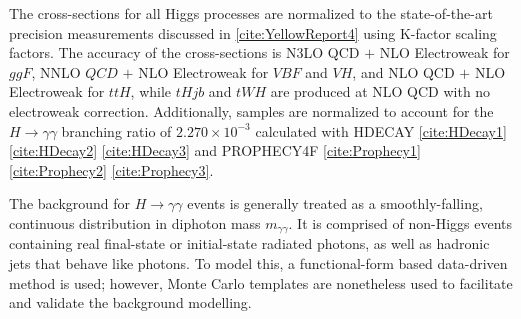 The cross-sections for all Higgs processes are normalized to the state-of-the-art precision measurements discussed in \ref{cite:YellowReport4} using K-factor scaling factors. The accuracy of the cross-sections is N3LO QCD $+$ NLO Electroweak for $ggF$, NNLO $QCD$ $+$ NLO Electroweak for $VBF$ and $VH$, and NLO QCD $+$ NLO Electroweak for $ttH$, while $tHjb$ and $tWH$ are produced at NLO QCD with no electroweak correction. Additionally, samples are normalized to account for the $H \rightarrow \gamma \gamma$ branching ratio of $2.270 \times 10^{-3}$ calculated with HDECAY \ref{cite:HDecay1} \ref{cite:HDecay2} \ref{cite:HDecay3} and PROPHECY4F \ref{cite:Prophecy1} \ref{cite:Prophecy2} \ref{cite:Prophecy3}.

\begin{table}[h!]
  \centering
  \caption{Cross sections times branching ratio values used to normalize each production mode. The values correspond to the state-of-the-art predictions and are taken from the CERN Yellow Report \ref{cite:YellowReport4}.}
  \label{tab:signal_samples_norm}
\end{table}  

The background for $H \rightarrow \gamma \gamma$ events is generally treated as a smoothly-falling, continuous distribution in diphoton mass $m_{\gamma \gamma}$. It is comprised of non-Higgs events containing real final-state or initial-state radiated photons, as well as hadronic jets that behave like photons. To model this, a functional-form based data-driven method is used; however, Monte Carlo templates are nonetheless used to facilitate and validate the background modelling.


